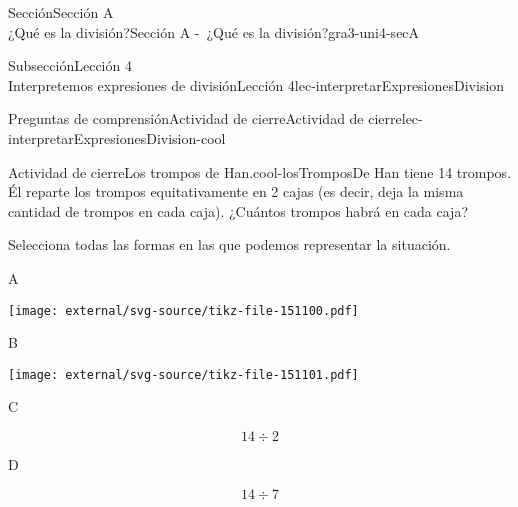 \begin{sectionptx}{Sección}{{\Large Sección A\\}¿Qué es la división?}{}{Sección A -~¿Qué es la división?}{}{}{gra3-uni4-secA}
\begin{subsectionptx}{Subsección}{{\normalsize Lección 4\\[-0.05cm]}Interpretemos expresiones de división}{}{Lección 4}{}{}{lec-interpretarExpresionesDivision}
\begin{reading-questions-subsubsection}{Preguntas de comprensión}{Actividad de cierre}{}{Actividad de cierre}{}{}{lec-interpretarExpresionesDivision-cool}
\begin{project}{Actividad de cierre}{Los trompos de Han.}{cool-losTromposDe}%
Han tiene 14 trompos. Él reparte los trompos equitativamente en 2 cajas (es decir, deja la misma cantidad de trompos en cada caja). ¿Cuántos trompos habrá en cada caja?%
\par
Selecciona \alert{todas} las formas en las que podemos representar la situación.%
\begin{sidebyside}{4}{0.0075}{0.0075}{0.015}%
\begin{sbspanel}{0.04}%
A%
\end{sbspanel}%
\begin{sbspanel}{0.43}%
\texttt{[image: external/svg-source/tikz-file-151100.pdf]}
\end{sbspanel}%
\begin{sbspanel}{0.04}%
B%
\end{sbspanel}%
\begin{sbspanel}{0.43}%
\texttt{[image: external/svg-source/tikz-file-151101.pdf]}
\end{sbspanel}%
\end{sidebyside}%
\begin{sidebyside}{4}{0.0075}{0.0075}{0.015}%
\begin{sbspanel}{0.04}%
C%
\end{sbspanel}%
\begin{sbspanel}{0.43}%
\par
%
\begin{equation*}
14\div 2
\end{equation*}
%
\end{sbspanel}%
\begin{sbspanel}{0.04}%
\par
D%
\end{sbspanel}%
\begin{sbspanel}{0.43}%
\par
%
\begin{equation*}
14\div 7
\end{equation*}
%
\end{sbspanel}%
\end{sidebyside}%
\end{project}%
\end{reading-questions-subsubsection}
\end{subsectionptx}
%
%
\typeout{************************************************}
\typeout{************************************************}

\end{sectionptx}
